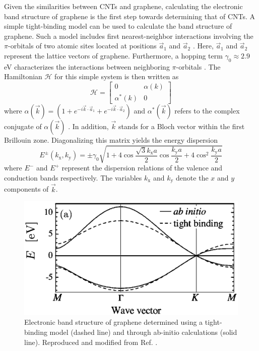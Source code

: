 Given the similarities between CNTs and graphene, calculating the electronic band structure of graphene is the first step towards determining that of CNTs. A simple tight-binding model can be used to calculate the band structure of graphene. Such a model includes first nearest-neighbor interactions involving the $\pi$-orbitals of two atomic sites located at positions $\vec{a}_1$ and $\vec{a}_2$ \cite{charlier2007electronic}. Here, $\vec{a}_1$ and $\vec{a}_2$ represent the lattice vectors of graphene. Furthermore, a hopping term $\gamma_0 \approx 2.9$ eV  characterizes the interactions between neighboring $\pi$-orbitals \cite{charlier2007electronic}. The Hamiltonian $\mathcal{H}$ for this simple system is then written as
%
\begin{equation}
	\mathcal{H} = \begin{bmatrix}
	0 & \alpha(k) \\
	\alpha^*(k) & 0
	\end{bmatrix}
\end{equation}
%
where $\alpha(\vec{k}) = (1 + e^{-i \vec{k}\cdot \vec{a}_1} + e^{-i \vec{k}\cdot \vec{a}_2})$ and $\alpha^*(\vec{k})$ refers to the complex conjugate of $\alpha(\vec{k})$ \cite{charlier2007electronic}. In addition, $\vec{k}$ stands for a Bloch vector within the first Brillouin zone. Diagonalizing this matrix yields the energy dispersion
%
\begin{equation}
	E^{\pm} (k_\text{x}, k_\text{y}) = \pm \gamma_0 \sqrt{1 + 4 \cos\dfrac{\sqrt{3}k_\text{x} a}{2}\cos\dfrac{k_\text{y} a}{2} + 4 \cos^2 \dfrac{k_\text{y} a}{2}}
	\label{eq:graphene_band}
\end{equation}
 where $E^-$ and $E^+$ represent the dispersion relations of the valence and conduction bands respectively. The variables $k_\text{x}$ and $k_\text{y}$ denote the $x$ and $y$ components of $\vec{k}$.
%
\begin{figure}[h]
	\centering
	\includegraphics[scale=0.5]{images/chapter_optical_props/graphene_band_charlier}
	\caption{Electronic band structure of graphene determined using a tight-binding model (dashed line) and through ab-initio calculations (solid line). Reproduced and modified from Ref. \cite{reich2002tight}.}
	\label{fig:graphene_band}
\end{figure}

